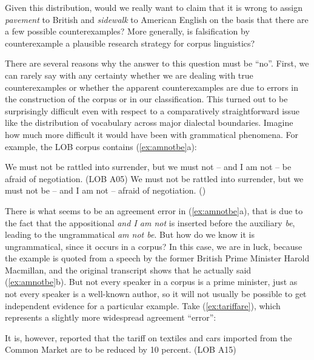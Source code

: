 Given this distribution,  would we really want to claim that it is wrong to assign \textit{pavement} to British  and \textit{sidewalk} to American  English on the basis that there are a few possible counterexamples?  More generally, is falsification  by counterexample a plausible research strategy for corpus linguistics?

There are several reasons why the answer to this question must be ``no''. First, we can rarely say with any certainty whether we are dealing with true counterexamples  or whether the apparent counterexamples are due to errors in the construction of the corpus or in our classification. This turned out to be surprisingly difficult even with respect to a comparatively straightforward issue like the distribution  of vocabulary across major dialectal boundaries. Imagine how much more difficult it would have been with grammatical phenomena. For example, the LOB  corpus contains (\ref{ex:amnotbe}a):

\begin{exe}
\ex
\begin{xlist}
\label{ex:amnotbe}
\ex We must not be rattled into surrender, but we must not -- and I am not -- be afraid of negotiation. (LOB A05)
\ex We must not be rattled into surrender, but we must not be -- and I am not -- afraid of negotiation. (\citealt{macmillan_house_1961})
\end{xlist}
\end{exe}

There is what seems to be an agreement error in (\ref{ex:amnotbe}a), that is due to the fact that the appositional \textit{and I am not} is inserted before the auxiliary \textit{be}, leading to the ungrammatical  \textit{am not be}. But how do we know it is ungrammatical, since it occurs in a corpus? In this case, we are in luck, because the example is quoted from a speech by the former British Prime Minister Harold Macmillan, and the original transcript  shows that he actually said (\ref{ex:amnotbe}b). But not every speaker in a corpus is a prime minister, just as not every speaker is a well\hyp{}known author, so it will not usually be possible to get independent evidence for a particular example. Take (\ref{ex:tariffare}), which represents a slightly more widespread agreement ``error'':

\begin{exe}
\ex It is, however, reported that the tariff on textiles and cars imported from the Common Market are to be reduced by 10 percent. (LOB A15)
\label{ex:tariffare}
\end{exe}

